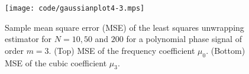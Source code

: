 \documentclass[aap]{imsart}
\begin{document}
\begin{figure}[p] 
   	\centering 
  		\texttt{[image: code/gaussianplot4-3.mps]}
  		\caption{Sample mean square error (MSE) of the least squares unwrapping estimator for $N=10,50$ and $200$ for a polynomial phase signal of order $m=3$. (Top) MSE of the frequency coefficient $\mu_0$.  (Bottom) MSE of the cubic coefficient $\mu_3$.} 
  		\label{plot:polyest1} 
 \end{figure} 




\end{document}
